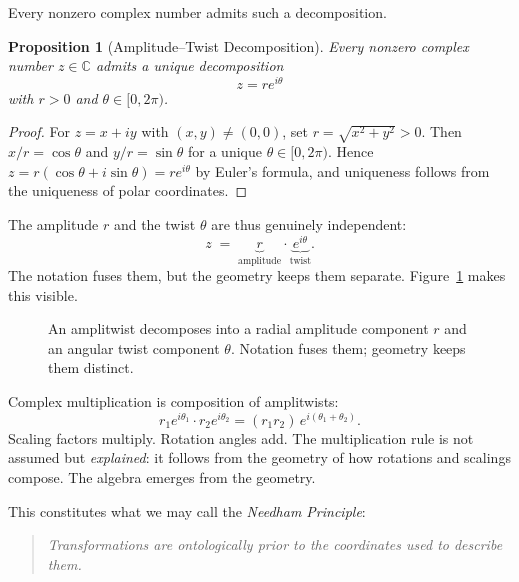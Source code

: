 \documentclass[12pt]{article}
\newtheorem{proposition}[theorem]{Proposition}
\begin{document}
Every nonzero complex number admits such a decomposition.

\begin{proposition}[Amplitude--Twist Decomposition]
Every nonzero complex number $z \in \mathbb{C}$ admits a unique decomposition
\[
z = r e^{i\theta}
\]
with $r > 0$ and $\theta \in [0, 2\pi)$.
\end{proposition}

\begin{proof}
For $z = x + iy$ with $(x,y) \neq (0,0)$, set $r = \sqrt{x^2 + y^2} > 0$.
Then $x/r = \cos\theta$ and $y/r = \sin\theta$ for a unique $\theta \in [0,2\pi)$.
Hence $z = r(\cos\theta + i\sin\theta) = re^{i\theta}$ by Euler's formula,
and uniqueness follows from the uniqueness of polar coordinates.
\end{proof}

The amplitude $r$ and the twist $\theta$ are thus genuinely independent:
\[
z \;=\; \underbrace{r}_{\text{amplitude}} \cdot \underbrace{e^{i\theta}}_{\text{twist}}.
\]
The notation fuses them, but the geometry keeps them separate. Figure~\ref{fig:amplitwist} makes this visible.

\begin{figure}[ht]
\centering
{}
\caption{An amplitwist decomposes into a radial amplitude component $r$
and an angular twist component $\theta$. Notation fuses them; geometry
keeps them distinct.}
\label{fig:amplitwist}
\end{figure}

Complex multiplication is composition of amplitwists:
\[
r_1 e^{i\theta_1} \cdot r_2 e^{i\theta_2} = (r_1 r_2)\, e^{i(\theta_1 + \theta_2)}.
\]
Scaling factors multiply. Rotation angles add. The multiplication rule is not assumed but \emph{explained}: it follows from the geometry of how rotations and scalings compose. The algebra emerges from the geometry.

This constitutes what we may call the \emph{Needham Principle}:

\begin{quote}
\emph{Transformations are ontologically prior to the coordinates used to describe them.}
\end{quote}
\end{document}
